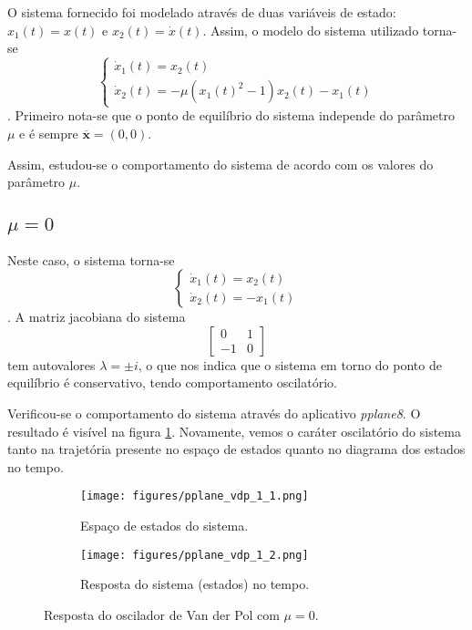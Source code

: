 \documentclass[a4paper]{report}
\begin{document}

O sistema fornecido foi modelado através de duas variáveis de estado: $x_1(t)=x(t)$ e $x_2(t)=\dot{x}(t)$. Assim, o modelo do sistema utilizado torna-se \[
    \begin{cases}
        \dot{x}_1(t) = x_2(t) \\
	\dot{x}_2(t) = -\mu\left( x_1(t)^2 - 1 \right) x_2(t) - x_1(t)
    \end{cases}
\]. Primeiro nota-se que o ponto de equilíbrio do sistema independe do parâmetro $\mu$ e é sempre $\bm{\overline{x}}=(0,0)$.

Assim, estudou-se o comportamento do sistema de acordo com os valores do parâmetro $\mu$.

\subsection*{$\mu = 0$}

Neste caso, o sistema torna-se \[
    \begin{cases}
        \dot{x}_1(t) = x_2(t) \\
	\dot{x}_2(t) = - x_1(t)
    \end{cases}
\]. A matriz jacobiana do sistema \[
\begin{bmatrix} 0 & 1 \\ -1 & 0 \end{bmatrix} 
\] tem autovalores $\lambda = \pm i$, o que nos indica que o sistema em torno do ponto de equilíbrio é conservativo, tendo comportamento oscilatório.

Verificou-se o comportamento do sistema através do aplicativo \emph{pplane8}. O resultado é visível na figura \ref{fig:figures-pplane_vdp_1}. Novamente, vemos o caráter oscilatório do sistema tanto na trajetória presente no espaço de estados quanto no diagrama dos estados no tempo.

\begin{figure}[H]
    \centering
    \begin{subfigure}{0.45\textwidth}
	\texttt{[image: figures/pplane\_vdp\_1\_1.png]}
	\caption{Espaço de estados do sistema.}
    \end{subfigure}
    \begin{subfigure}{0.45\textwidth}
	\texttt{[image: figures/pplane\_vdp\_1\_2.png]}
	\caption{Resposta do sistema (estados) no tempo.}
    \end{subfigure}
    \caption{Resposta do oscilador de Van der Pol com $\mu=0$.}
    \label{fig:figures-pplane_vdp_1}
\end{figure}
\end{document}

